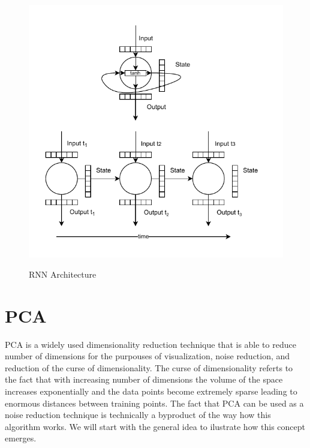 \begin{figure}[!h]
    \centering
    \caption{\acl{RNN} Architecture}
        \includegraphics[width=1\textwidth]{Figures/RNN.drawio.pdf}
    \label{fig:rnn_architecture}
\end{figure}


\section{\acl{PCA}}

\ac{PCA} is a widely used dimensionality reduction technique that is able
to reduce number of dimensions for the purpouses of visualization, noise reduction, and
reduction of the curse of dimensionality. The curse of 
dimensionality referts to the fact that with increasing number of 
dimensions the volume of the space increases exponentially and the data points become
extremely sparse leading to enormous distances between training points.
The fact that \ac{PCA} can be used as a noise reduction technique is 
technically a byproduct of the way how this algorithm works. We will start with the
general idea to ilustrate how this concept emerges.


